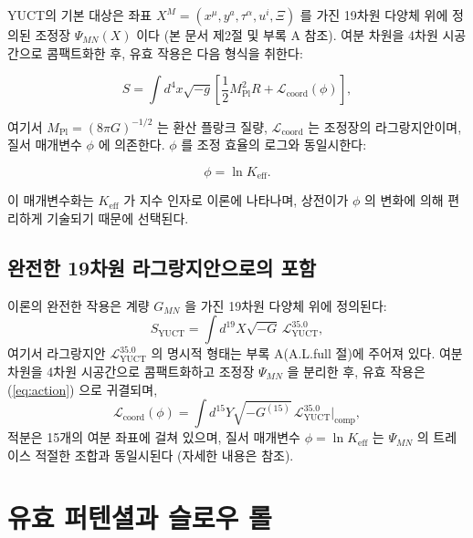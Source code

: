 \documentclass[11pt,a4paper]{article}
\theoremstyle{remark}
\newcommand{\Keff}{K_{\mathrm{eff}}}
\newcommand{\Mpl}{M_{\mathrm{Pl}}}
\begin{document}
	YUCT의 기본 대상은 좌표 $X^M = (x^\mu, y^a, \tau^\alpha, u^i, \Xi)$ 를 가진 19차원 다양체 위에 정의된 조정장 $\Psi_{MN}(X)$ 이다 (본 문서 제2절 및 부록 A 참조). 여분 차원을 4차원 시공간으로 콤팩트화한 후, 유효 작용은 다음 형식을 취한다:
	
	\begin{equation}
		S = \int d^4x \sqrt{-g} \left[ \frac{1}{2} \Mpl^2 R + \mathcal{L}_{\mathrm{coord}}(\phi) \right],
		\label{eq:action}
	\end{equation}
	
	여기서 $\Mpl = (8\pi G)^{-1/2}$ 는 환산 플랑크 질량, $\mathcal{L}_{\mathrm{coord}}$ 는 조정장의 라그랑지안이며, 질서 매개변수 $\phi$ 에 의존한다. $\phi$ 를 조정 효율의 로그와 동일시한다:
	
	\begin{equation}
		\phi = \ln \Keff.
		\label{eq:phi-def}
	\end{equation}
	
	이 매개변수화는 $\Keff$ 가 지수 인자로 이론에 나타나며, 상전이가 $\phi$ 의 변화에 의해 편리하게 기술되기 때문에 선택된다.
	
	\subsection{완전한 19차원 라그랑지안으로의 포함}
	
	이론의 완전한 작용은 계량 $G_{MN}$ 을 가진 19차원 다양체 위에 정의된다:
	\begin{equation}
		S_{\text{YUCT}} = \int d^{19}X \sqrt{-G} \, \mathcal{L}_{\text{YUCT}}^{35.0},
		\label{eq:full-action}
	\end{equation}
	여기서 라그랑지안 $\mathcal{L}_{\text{YUCT}}^{35.0}$ 의 명시적 형태는 부록 A(A.L.full 절)에 주어져 있다. 여분 차원을 4차원 시공간으로 콤팩트화하고 조정장 $\Psi_{MN}$ 을 분리한 후, 유효 작용은 (\ref{eq:action}) 으로 귀결되며,
	\begin{equation}
		\mathcal{L}_{\mathrm{coord}}(\phi) = \int d^{15}Y \sqrt{-G^{(15)}} \, \mathcal{L}_{\text{YUCT}}^{35.0}\big|_{\text{comp}},
	\end{equation}
	적분은 15개의 여분 좌표에 걸쳐 있으며, 질서 매개변수 $\phi = \ln\Keff$ 는 $\Psi_{MN}$ 의 트레이스 적절한 조합과 동일시된다 (자세한 내용은 \cite{Yakushev2026} 참조).
	
	\section{유효 퍼텐셜과 슬로우 롤}
	\label{sec:potential}
	
\end{document}
